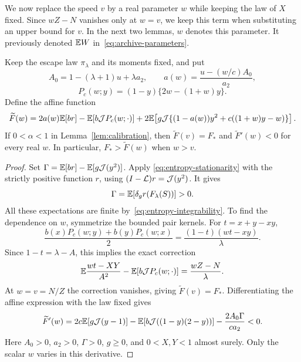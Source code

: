 We now replace the speed $v$ by a real parameter $w$ while keeping the
law of $X$ fixed. Since $wZ-N$ vanishes only at $w=v$, we keep this
term when substituting an upper bound for $v$. In the next two lemmas,
$w$ denotes this parameter. It previously denoted $\mathbb E W$
in~\eqref{eq:archive-parameters}.

\begin{lemma}\label{lem:assigned-floor}
Keep the escape law $\pi_\lambda$ and its moments fixed, and put
\[
 A_0=1-(\lambda+1)u+\lambda a_2,\qquad
 a(w)=\frac{u-(w/c)A_0}{a_2},
\]
\[
 P_c(w;y)=(1-y)\{2w-(1+w)y\}.
\]
Define the affine function
\begin{equation}\label{eq:assigned-floor-definition}
 \widetilde F(w)=2a(w)\mathbb E[br]
 -\mathbb E[b\mathcal J P_c(w;\cdot)]
 +2\mathbb E\!\left[g\mathcal J\{(1-a(w))y^2+c((1+w)y-w)\}\right].
\end{equation}
If $0<\alpha<1$ in Lemma~\ref{lem:calibration}, then
$\widetilde F(v)=F_*$ and $\widetilde F'(w)<0$ for every real $w$.
In particular, $F_*>\widetilde F(w)$ when $w>v$.
\end{lemma}
\begin{proof}
Set $\Gamma=\mathbb E[br]-\mathbb E[g\mathcal J(y^2)]$.  Apply
\eqref{eq:entropy-stationarity} with the strictly positive function $r$,
using $(I-\mathcal L)r=\mathcal J(y^2)$.  It gives
\[
 \Gamma=\mathbb E[\delta_g r(F_\lambda(S))]>0.
\]
All these expectations are finite by~\eqref{eq:entropy-integrability}.
To find the dependence on $w$, symmetrize the bounded
pair kernels.  For $t=x+y-xy$,
\[
 \frac{b(x)P_c(w;y)+b(y)P_c(w;x)}2
 =\frac{(1-t)(wt-xy)}\lambda.
\]
Since $1-t=\lambda-A$, this implies the exact correction
\begin{equation}\label{eq:assigned-C-correction}
 \mathbb E\frac{wt-XY}{A^2}-\mathbb E[b\mathcal J P_c(w;\cdot)]
 =\frac{wZ-N}\lambda.
\end{equation}
At $w=v=N/Z$ the correction vanishes, giving
$\widetilde F(v)=F_*$.  Differentiating the affine expression with the
law fixed gives
\[
 \widetilde F'(w)=2c\mathbb E[g\mathcal J(y-1)]
 -\mathbb E[b\mathcal J((1-y)(2-y))]-\frac{2A_0\Gamma}{c a_2}<0.
\]
Here $A_0>0$, $a_2>0$, $\Gamma>0$, $g\ge0$, and
$0<X,Y<1$ almost surely. Only the scalar $w$ varies in this derivative.
\end{proof}

